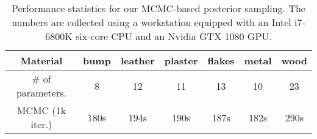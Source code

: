 \begin{table}[!ht]
	\centering
	\caption[Performance]{\label{tab:bayesian:performance}
		Performance statistics for our MCMC-based posterior sampling.
		The numbers are collected using a workstation equipped with an Intel i7-6800K six-core CPU and an Nvidia GTX 1080 GPU.
	}
	\addtolength{\tabcolsep}{3pt}
	\begin{tabular}{c|cccccc}
		Material & bump & leather & plaster & flakes & metal & wood\\
		\hline
		\# of parameters. & 8 & 12 & 11 & 13 & 10 & 23\\
		MCMC (1k iter.) & 180s & 194s & 190s & 187s & 182s & 290s
	\end{tabular}
\end{table}
